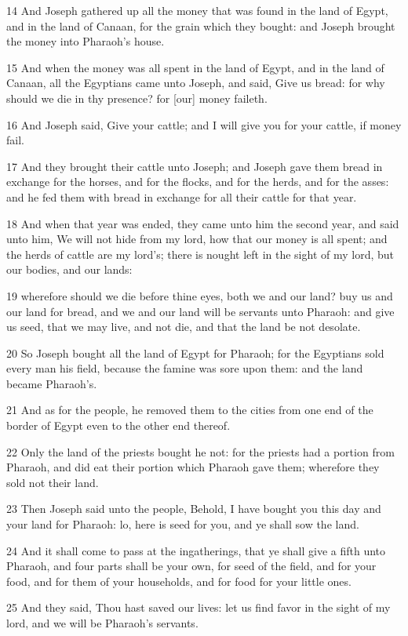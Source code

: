 \par 14 And Joseph gathered up all the money that was found in the land of Egypt, and in the land of Canaan, for the grain which they bought: and Joseph brought the money into Pharaoh's house.
\par 15 And when the money was all spent in the land of Egypt, and in the land of Canaan, all the Egyptians came unto Joseph, and said, Give us bread: for why should we die in thy presence? for [our] money faileth.
\par 16 And Joseph said, Give your cattle; and I will give you for your cattle, if money fail.
\par 17 And they brought their cattle unto Joseph; and Joseph gave them bread in exchange for the horses, and for the flocks, and for the herds, and for the asses: and he fed them with bread in exchange for all their cattle for that year.
\par 18 And when that year was ended, they came unto him the second year, and said unto him, We will not hide from my lord, how that our money is all spent; and the herds of cattle are my lord's; there is nought left in the sight of my lord, but our bodies, and our lands:
\par 19 wherefore should we die before thine eyes, both we and our land? buy us and our land for bread, and we and our land will be servants unto Pharaoh: and give us seed, that we may live, and not die, and that the land be not desolate.
\par 20 So Joseph bought all the land of Egypt for Pharaoh; for the Egyptians sold every man his field, because the famine was sore upon them: and the land became Pharaoh's.
\par 21 And as for the people, he removed them to the cities from one end of the border of Egypt even to the other end thereof.
\par 22 Only the land of the priests bought he not: for the priests had a portion from Pharaoh, and did eat their portion which Pharaoh gave them; wherefore they sold not their land.
\par 23 Then Joseph said unto the people, Behold, I have bought you this day and your land for Pharaoh: lo, here is seed for you, and ye shall sow the land.
\par 24 And it shall come to pass at the ingatherings, that ye shall give a fifth unto Pharaoh, and four parts shall be your own, for seed of the field, and for your food, and for them of your households, and for food for your little ones.
\par 25 And they said, Thou hast saved our lives: let us find favor in the sight of my lord, and we will be Pharaoh's servants.
